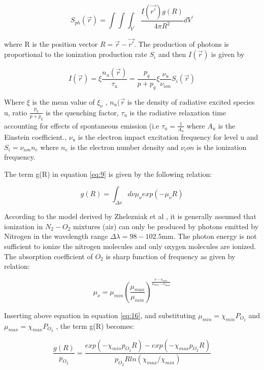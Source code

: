 \documentclass{article}
\begin{document}
\begin{equation} \label{eq:14}
S_{ph}(\vec{r}) = {\int\int\int_{V^'}} \frac{I(\vec{r'}) g(R)}{4 \pi {R^2}} d{V^'}
\end{equation} 

where R is the position vector $R= \vec{r}-\vec{r'}$. The production of photons is proportional to the ionization production rate $S_i$ and then $I(\vec{r})$ is given by 

\begin{equation}
I(\vec{r}) = \xi \frac{n_u(\vec{r})}{\tau_u}= \frac{p_q}{p+p_q} \xi \frac{\nu_u}{\nu_{ion}} S_i(\vec{r})
\end{equation} 

Where $\xi$ is the mean value of $\xi_\nu$ , $n_u(\vec{r}$ is the density of radiative excited species u, ratio $\frac{p_q}{p+p_q}$ is the quenching factor, $\tau_u$ is the radiative relaxation time accounting for effects of spontaneous emission (i.e $\tau_u = \frac{1}{A_u}$ where $A_u$ is the Einstein coefficient., $\nu_u$ is the electron impact excitation frequency for level u and $S_i=\nu_{ion} n_e$ where $n_e$ is the electron number density and $\nu_ion$ is the ionization frequency. 

The term g(R) in equation \ref{eq:9} is given by the following relation:

\begin{equation} \label{eq:16}
g(R) = \int_{\Delta \nu} d\nu \mu_\nu exp(-\mu_\nu R)
\end{equation} 


According to the model derived by Zhelezniak et al \cite{ZhelezniakM.B.andMnatsakanianA.K.andSizykh1982PhotoionizationDischarge}, it is generally assumed that ionization in $N_2-O_2$ mixtures (air) can only be produced by photons emitted by Nitrogen in the wavelength range $\Delta \lambda = 98-102.5$mm. The photon energy is not sufficient to ionize the nitrogen molecules and only oxygen molecules are ionized. The absorption coefficient of $O_2$ is sharp function of frequency as given by relation:

\begin{equation}
\mu_\nu = \mu_{min} ( \frac{\mu_{max}}{\mu_{min}} ) ^ {\frac{\nu-\nu_{min}}{\nu_{max}-\nu_{min}}}
\end{equation} 

Inserting above equation in equation \ref{eq:16}, and substituting $\mu_{min}=\chi_{min} P_O_2$ and $\mu_{max}=\chi_{max} P_O_2$ , the term g(R) becomes:

\begin{equation}
\frac{g(R)}{p_{O_2}} = \frac{exp(-\chi_{min} p_{O_2} R)- exp(-\chi_{max} p_{O_2} R)}{p_{O_2} R ln(\chi_{max} / \chi_{min})}
\end{equation} 
\end{document}

